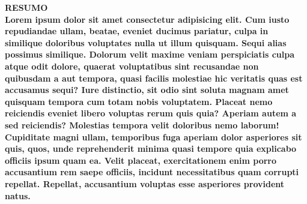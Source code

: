 \documentclass[12pt,a4paper,oneside,brazil]{abntex2}
\begin{document}
\centering
\ABNTEXchapterfont\bfseries{\textsc{\MakeUppercase{Resumo}}}\\
\vspace*{3cm}
\justifying
\normalfont
Lorem ipsum dolor sit amet consectetur adipisicing elit. Cum iusto repudiandae ullam, beatae, eveniet ducimus pariatur, culpa in similique doloribus voluptates nulla ut illum quisquam. Sequi alias possimus similique. Dolorum velit maxime veniam perspiciatis culpa atque odit dolore, quaerat voluptatibus sint recusandae non quibusdam a aut tempora, quasi facilis molestiae hic veritatis quas est accusamus sequi? Iure distinctio, sit odio sint soluta magnam amet quisquam tempora cum totam nobis voluptatem. Placeat nemo reiciendis eveniet libero voluptas rerum quis quia? Aperiam autem a sed reiciendis? Molestias tempora velit doloribus nemo laborum! Cupiditate magni ullam, temporibus fuga aperiam dolor asperiores sit quis, quos, unde reprehenderit minima quasi tempore quia explicabo officiis ipsum quam ea. Velit placeat, exercitationem enim porro accusantium rem saepe officiis, incidunt necessitatibus quam corrupti repellat. Repellat, accusantium voluptas esse asperiores provident natus.
\clearpage
\end{document}
